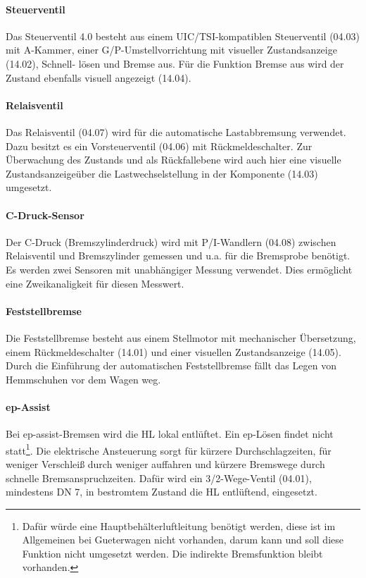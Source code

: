 \paragraph{Steuerventil}\label{sec:Bremsart}
Das Steuerventil 4.0 besteht aus einem UIC/\acrshort{TSI}-kompatiblen Steuerventil (04.03) mit A-Kammer, einer G/P-Umstellvorrichtung mit visueller Zustandsanzeige (14.02), Schnell- lösen und Bremse aus. Für die Funktion Bremse aus wird der Zustand ebenfalls visuell angezeigt (14.04).

\paragraph{Relaisventil} Das Relaisventil  (04.07) wird für die automatische Lastabbremsung verwendet. Dazu besitzt es ein Vorsteuerventil (04.06) mit Rückmeldeschalter. Zur Überwachung des Zustands und als Rückfallebene wird auch hier eine visuelle Zustandsanzeigeüber die \gls{Lastwechsel}stellung in der Komponente (14.03) umgesetzt.

\paragraph{C-Druck-Sensor} \label{sec:C-Druck}
Der C-Druck (Bremszylinderdruck) wird mit P/I-Wandlern (04.08) zwischen Relaisventil und Bremszylinder gemessen und u.a. für die \gls{Bremsprobe} benötigt. Es werden zwei Sensoren mit unabhängiger Messung verwendet. Dies ermöglicht eine Zweikanaligkeit für diesen Messwert.

\paragraph{Feststellbremse} Die Feststellbremse besteht aus einem Stellmotor mit mechanischer Übersetzung, einem Rückmeldeschalter (14.01) und einer visuellen Zustandsanzeige (14.05). Durch die Einführung der automatischen Feststellbremse fällt das Legen von \gls{Hemmschuh}en vor dem Wagen weg.

\paragraph{ep-Assist} Bei  \gls{ep-assist-Bremsen} wird die \gls{HL} lokal entlüftet. Ein ep-Lösen findet nicht statt\footnote{Dafür würde eine Hauptbehälterluftleitung benötigt werden, diese ist im Allgemeinen bei \gls{Gueterwagen} nicht vorhanden, darum kann und soll diese Funktion nicht umgesetzt werden. Die indirekte Bremsfunktion bleibt vorhanden.}.  Die elektrische Ansteuerung sorgt für kürzere Durchschlagzeiten, für weniger Verschleiß durch weniger auffahren und kürzere Bremswege durch schnelle Bremsanspruchzeiten. Dafür wird ein 3/2-Wege-Ventil (04.01), mindestens DN 7, in bestromtem Zustand die HL entlüftend, eingesetzt.

